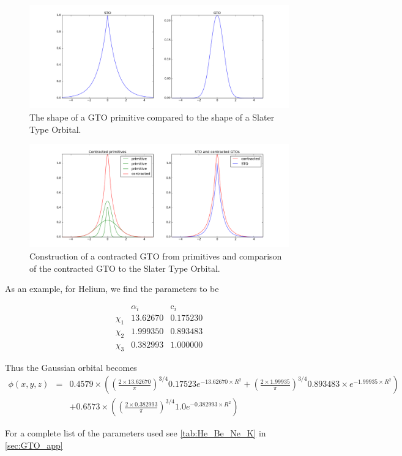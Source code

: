 		\begin{figure}
					\centering \includegraphics[width=0.95\linewidth]{../figures/GTO_vs_STO_plot}
					\protect\caption{The shape of a GTO primitive compared to the shape of a Slater Type Orbital.}
					\label{fig:GTO_vs_STO}
		\end{figure}

		\begin{figure}
					\centering \includegraphics[width=0.95\linewidth]{../figures/Primitives_vs_STO_plot}
					\protect\caption{Construction of a contracted GTO from primitives and comparison of the contracted GTO to the Slater Type Orbital.}
					\label{fig:Contracted_and_STO}
		\end{figure}

		As an example, for Helium, we find the parameters to be

		\[
		\begin{array}{ccc}
			 & \alpha_{i} & \mbox{c}_{i}\\
			\chi_{1} & 13.62670 & 0.175230\\
			\chi_{2} & 1.999350 & 0.893483\\
			\chi_{3} & 0.382993 & 1.000000
		\end{array}
		\]

		Thus the Gaussian orbital becomes
		\begin{eqnarray*}
			\phi\left(x,y,z\right) & = & 0.4579\times\left(\left(\frac{2\times13.62670}{\pi}\right)^{3/4}0.17523e^{-13.62670\times R^{2}}+\left(\frac{2\times1.99935}{\pi}\right)^{3/4}0.893483\times e^{-1.99935\times R^{2}}\right)\\
			 &  & +0.6573\times\left(\left(\frac{2\times0.382993}{\pi}\right)^{3/4}1.0e^{-0.382993\times R^{2}}\right)
		\end{eqnarray*}


		For a complete list of the parameters used see \cref{tab:He_Be_Ne_K} in \cref{sec:GTO_app}



